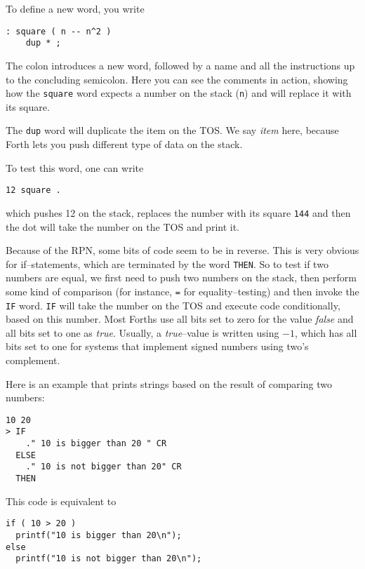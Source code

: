 To define a new word, you write

\begin{verbatim}
: square ( n -- n^2 )
    dup * ;
\end{verbatim}

The colon introduces a new word, followed by a name and all the instructions
up to the concluding semicolon.  Here you can see the comments in action,
showing how the \texttt{square} word expects a number on the stack
(\texttt{n}) and will replace it with its square.

The \texttt{dup} word will duplicate the item on the \ac{TOS}.  We
say \textit{item} here, because Forth lets you push different type of data
on the stack.

To test this word, one can write 
\begin{verbatim}
12 square .
\end{verbatim}

which pushes 12 on the stack, replaces the number with its square
\texttt{144} and then the dot will take the number on the \ac{TOS}
and print it.

Because of the \ac{RPN}, some bits of code seem to be in reverse.  This is
very obvious for if--statements, which are terminated by the word
\texttt{THEN}.  So to test if two numbers are equal, we first need to push
two numbers on the stack, then perform some kind of comparison (for
instance, \texttt{=} for equality--testing) and then invoke the
\texttt{IF} word.  \texttt{IF} will take the number on the \ac{TOS}
and execute code conditionally, based on this number.  Most Forths use all
bits set to zero for the value \textit{false} and all bits set to one as
\textit{true}.  Usually, a \textit{true}--value is written using $-1$,
which has all bits set to one for systems that implement signed numbers
using two's complement.

Here is an example that prints strings based on the result of comparing two
numbers:

\begin{verbatim}
10 20
> IF
    ." 10 is bigger than 20 " CR
  ELSE
    ." 10 is not bigger than 20" CR
  THEN
\end{verbatim}

This code is equivalent to

\begin{verbatim}
if ( 10 > 20 )
  printf("10 is bigger than 20\n");
else
  printf("10 is not bigger than 20\n");
\end{verbatim}

